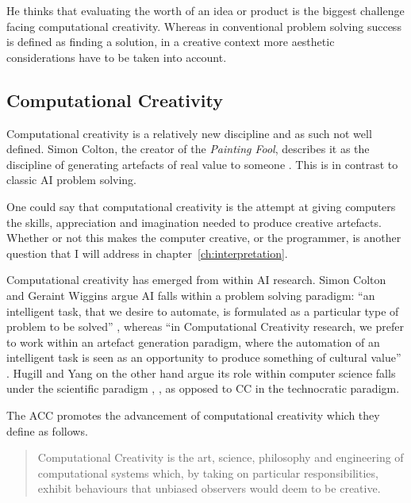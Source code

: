 He thinks that evaluating the worth of an idea or product is the biggest challenge facing computational creativity. Whereas in conventional problem solving success is defined as finding a solution, in a creative context more aesthetic considerations have to be taken into account. 


\subsection{Computational Creativity}
\label{s:compcrea}

Computational creativity is a relatively new discipline and as such not well defined. Simon Colton, the creator of the \textit{Painting Fool}, describes it as the discipline of generating artefacts of real value to someone \autocite*{Colton2008}. This is in contrast to classic \ac{AI} problem solving.

One could say that computational creativity is the attempt at giving computers the skills, appreciation and imagination needed to produce creative artefacts. Whether or not this makes the computer creative, or the programmer, is another question that I will address in chapter~\ref{ch:interpretation}.

Computational creativity has emerged from within \ac{AI} research. Simon Colton and Geraint Wiggins argue \ac{AI} falls within a problem solving paradigm: ``an intelligent task, that we desire to automate, is formulated as a particular type of problem to be solved'' \autocite*{Colton2012}, whereas ``in Computational Creativity research, we prefer to work within an artefact generation paradigm, where the automation of an intelligent task is seen as an opportunity to produce something of cultural value'' \autocite*{Colton2012}. Hugill and Yang on the other hand argue its role within computer science falls under the scientific paradigm \autocite*{Hugill2013c}, \autocite[see also][]{Eden2007}, as opposed to \acf{CC} in the technocratic paradigm.

The \acf{ACC} promotes the advancement of computational creativity which they define as follows.

\begin{quotation}
  Computational Creativity is the art, science, philosophy and engineering of computational systems which, by taking on particular responsibilities, exhibit behaviours that unbiased observers would deem to be creative. 
\end{quotation}

